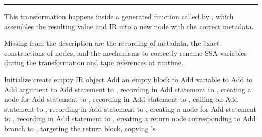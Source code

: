 \begin{algorithm}[p]
  \hrule\footnotesize
  \smallskip
  This transformation happens inside a generated function called by , which
  assembles the resulting value and IR into a new node with the correct metadata.
  \par\vspace{\baselineskip}
  Missing from the description are the recording of metadata, the exact constructions of nodes, and
  the mechanisms to correctly rename SSA variables during the transformation and tape references at
  runtime.
  \begin{algorithmic}
    \State Initialize  \Comment create empty IR object
    \State Add an empty block  to 
    \State Add variable  to 
    \EndIf
    \State Add  to 
    \EndFor
    \State Add argument  to 
    \State Add statement to , recording  in 
    \EndIf
    \State Add statement  to , creating a node for 
    \State Add statement to , recording  in 
    \EndFor
    \State Add statement  to , calling  on 
    \State Add statement to , recording  in 
    \State Add statement  to , creating a node for 
    \State Add statement to , recording  in 
    \EndIf
    \EndFor
    \State Add statement  to , creating a return node
    corresponding to 
    \State Add branch to , targeting the return block, copying 's

\end{algorithmic}
\end{algorithm}
